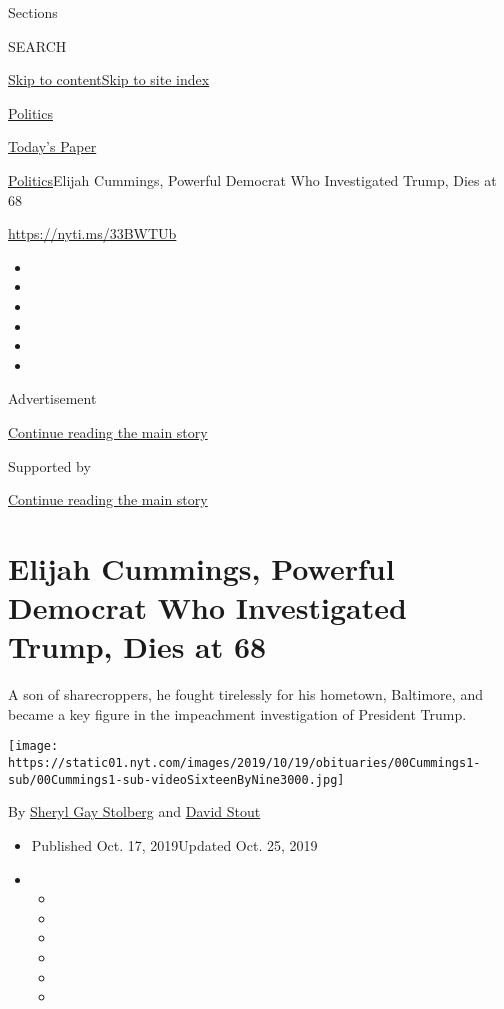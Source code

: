 Sections

SEARCH

\protect\hyperlink{site-content}{Skip to
content}\protect\hyperlink{site-index}{Skip to site index}

\href{https://www.nytimes.com/section/politics}{Politics}

\href{https://myaccount.nytimes.com/auth/login?response_type=cookie\&client_id=vi}{}

\href{https://www.nytimes.com/section/todayspaper}{Today's Paper}

\href{/section/politics}{Politics}\textbar{}Elijah Cummings, Powerful
Democrat Who Investigated Trump, Dies at 68

\url{https://nyti.ms/33BWTUb}

\begin{itemize}
\item
\item
\item
\item
\item
\item
\end{itemize}

Advertisement

\protect\hyperlink{after-top}{Continue reading the main story}

Supported by

\protect\hyperlink{after-sponsor}{Continue reading the main story}

\hypertarget{elijah-cummings-powerful-democrat-who-investigated-trump-dies-at-68}{%
\section{Elijah Cummings, Powerful Democrat Who Investigated Trump, Dies
at
68}\label{elijah-cummings-powerful-democrat-who-investigated-trump-dies-at-68}}

A son of sharecroppers, he fought tirelessly for his hometown,
Baltimore, and became a key figure in the impeachment investigation of
President Trump.

\texttt{[image: https://static01.nyt.com/images/2019/10/19/obituaries/00Cummings1-sub/00Cummings1-sub-videoSixteenByNine3000.jpg]}

By \href{https://www.nytimes.com/by/sheryl-gay-stolberg}{Sheryl Gay
Stolberg} and \href{https://www.nytimes.com/by/david-stout}{David Stout}

\begin{itemize}
\item
  Published Oct. 17, 2019Updated Oct. 25, 2019
\item
  \begin{itemize}
  \item
  \item
  \item
  \item
  \item
  \item
  \end{itemize}
\end{itemize}

